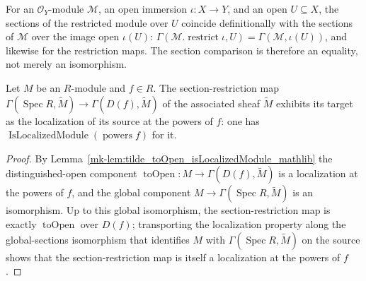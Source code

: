 \begin{lemma}
  \label{mk-lem:restrict_obj_mathlib}
  \mathlibok

  For an \(\mathcal{O}_Y\)-module \(\mathcal{M}\), an open immersion \(\iota : X \to Y\), and an open
  \(U \subseteq X\), the sections of the restricted module over \(U\) coincide definitionally with the
  sections of \(\mathcal{M}\) over the image open \(\iota(U)\):
  \(\Gamma(\mathcal{M}.\operatorname{restrict} \iota, U) = \Gamma(\mathcal{M}, \iota(U))\), and
  likewise for the restriction maps. The section comparison is therefore an equality, not merely an
  isomorphism.
\end{lemma}

\begin{lemma}\label{mk-lem:tilde_section_isLocalizedModule}
  \leanok

  Let \(M\) be an \(R\)-module and \(f \in R\). The section-restriction map
  \(\Gamma(\operatorname{Spec} R, \widetilde{M}) \to \Gamma(D(f), \widetilde{M})\) of the associated
  sheaf \(\widetilde{M}\) exhibits its target as the localization of its source at the powers of
  \(f\): one has \(\operatorname{IsLocalizedModule}(\operatorname{powers} f)\) for it.
\end{lemma}
\begin{proof}
  \leanok
  By Lemma~\ref{mk-lem:tilde_toOpen_isLocalizedModule_mathlib} the distinguished-open component
  \(\operatorname{toOpen} : M \to \Gamma(D(f), \widetilde{M})\) is a localization at the powers of
  \(f\), and the global component \(M \to \Gamma(\operatorname{Spec} R, \widetilde{M})\) is an
  isomorphism. Up to this global isomorphism, the section-restriction map is exactly
  \(\operatorname{toOpen}\) over \(D(f)\); transporting the localization property along the
  global-sections isomorphism that identifies \(M\) with \(\Gamma(\operatorname{Spec} R,
  \widetilde{M})\) on the source shows that the section-restriction map is itself a localization at the
  powers of \(f\).
\end{proof}

